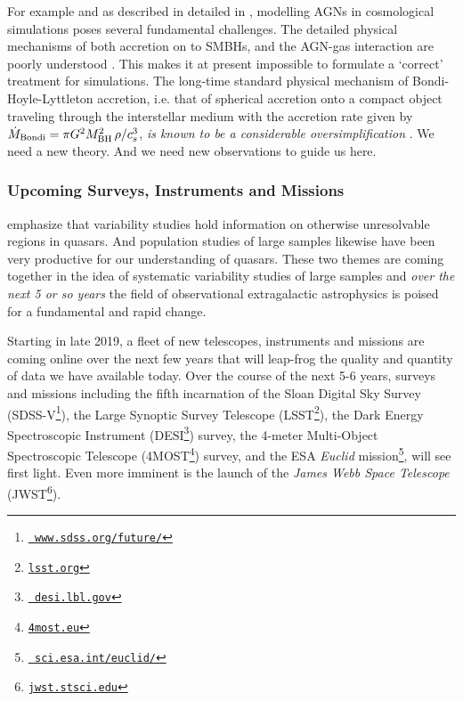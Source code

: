 \smallskip
\smallskip
\noindent
For example and as described in detailed in \citet{Weinberger2017},
modelling AGNs in cosmological simulations poses several fundamental
challenges. The detailed physical mechanisms of both accretion on to
SMBHs, and the AGN-gas interaction are poorly understood
\citep{Hopkins_Quataert2010, Hopkins_Quataert2011,
Huarte-Espinosa2011, Gaibler2012, Angles-Alcazar2013, Gaspari2013,
Cielo2014, Costa2014, Angles-Alcazar2015, Emsellem2015,
CurtisSijacki2015, CurtisSijacki2016a, CurtisSijacki2016b,
Rosas-Guevara2015, Roos2015, Hopkins2016, Bieri2017,
Angles-Alcazar2017}. This makes it at present impossible to formulate
a `correct' treatment for simulations.  The long-time standard
physical mechanism of Bondi-Hoyle-Lyttleton accretion, i.e. that of
spherical accretion onto a compact object traveling through the
interstellar medium \citep{Hoyle_Lyttleton1939, Bondi_Hoyle1944,
Bondi1952} with the accretion rate given by $\dot {M}_{\rm Bondi} =
\pi G^{2 }M_{\rm BH}^{2} \, \rho / c_{s}^{3}$, {\it is known to
be a considerable oversimplification} \citep[e.g.,][]{Edgar2004}.
We need a new theory. And we need new observations to guide us here. 


\subsubsection{Upcoming Surveys, Instruments and Missions}
\noindent
\citep{Lawrence2016_ASPC} emphasize that variability studies hold
information on otherwise unresolvable regions in quasars. And
population studies of large samples likewise have been very productive
for our understanding of quasars. These two themes are coming together
in the idea of systematic variability studies of large samples and
{\it over the next 5 or so years} the field of observational
extragalactic astrophysics is poised for a fundamental and rapid
change.

\smallskip
\smallskip
\noindent
Starting in late 2019, a fleet of new telescopes, instruments and
missions are coming online over the next few years that will leap-frog
the quality and quantity of data we have available today. Over the
course of the next 5-6 years, surveys and missions including the fifth
incarnation of the Sloan Digital Sky Survey
(SDSS-V\footnote{\href{www.sdss.org/future/}{{\tt
www.sdss.org/future/}}}), the Large Synoptic Survey Telescope
(LSST\footnote{\href{lsst.org}{{\tt lsst.org}}}), the Dark Energy
Spectroscopic Instrument (DESI\footnote{\href{desi.lbl.gov}{{\tt
desi.lbl.gov}}}) survey, the 4-meter Multi-Object Spectroscopic
Telescope (4MOST\footnote{\href{4most.eu}{{\tt 4most.eu}}}) survey,
and the ESA {\it Euclid}
mission\footnote{\href{sci.esa.int/euclid/}{{\tt
sci.esa.int/euclid/}}}, will see first light. Even more imminent is
the launch of the {\it James Webb Space Telescope}
(JWST\footnote{\href{jwst.stsci.edu}{{\tt jwst.stsci.edu}}}).


